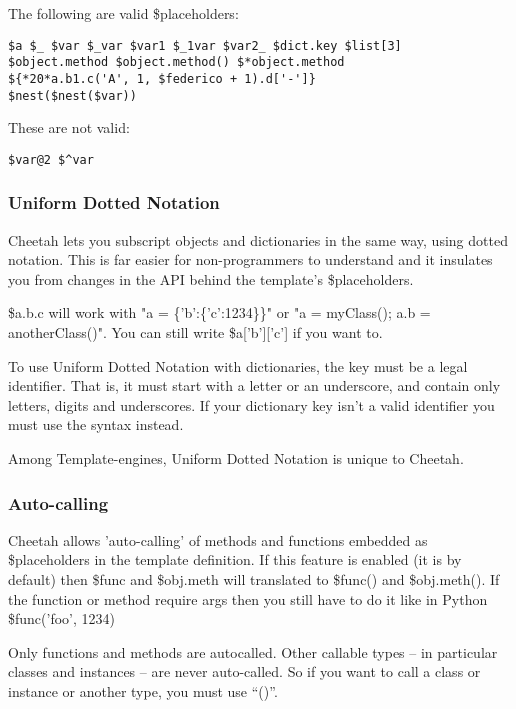 The following are valid \$placeholders:
\begin{verbatim}
$a $_ $var $_var $var1 $_1var $var2_ $dict.key $list[3]
$object.method $object.method() $*object.method
${*20*a.b1.c('A', 1, $federico + 1).d['-']}
$nest($nest($var))
\end{verbatim}

These are not valid:
\begin{verbatim}
$var@2 $^var
\end{verbatim}
          
\subsubsection{Uniform Dotted Notation}
\label{TDL.placeholders.unifiedDottedNotation}

Cheetah lets you subscript objects and dictionaries in the same way, using
dotted notation.  This is far easier for non-programmers to understand and it
insulates you from changes in the API behind the template's \$placeholders.

\$a.b.c will work with "a = \{'b':\{'c':1234\}\}" or "a = myClass(); a.b =
anotherClass()". You can still write \$a['b']['c'] if you want to.

To use Uniform Dotted Notation with dictionaries, the key must be a legal
identifier.  That is, it must start with a letter or an underscore, and contain
only letters, digits and underscores.  If your dictionary key isn't a valid
identifier you must use the  syntax instead.

Among Template-engines, Uniform Dotted Notation is unique to Cheetah.

\subsubsection{Auto-calling}
\label{TDL.placeholders.autocalling}

Cheetah allows 'auto-calling' of methods and functions embedded as
\$placeholders in the template definition.  If this feature is enabled
(it is by default) then \$func and \$obj.meth will translated to \$func() and
\$obj.meth().  If the function or method require args then you still
have to do it like in Python \$func('foo', 1234)

Only functions and methods are autocalled.  Other callable types -- in
particular classes and instances -- are never auto-called.  So if you want to
call a class or instance or another type, you must use ``()''.

